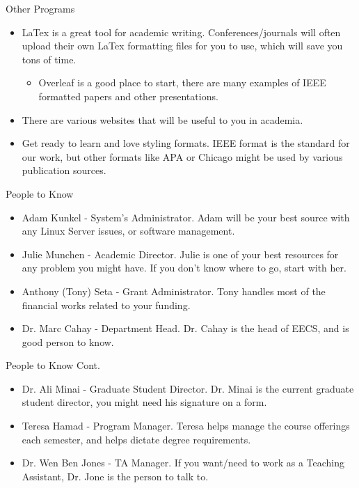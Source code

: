 \documentclass[handout]{beamer}
\begin{document}
\begin{frame}{Other Programs}
\begin{itemize}
  \item LaTex is a great tool for academic writing. Conferences/journals will often upload their own LaTex formatting files for you to use, which will save you tons of time. 
  \begin{itemize}
      \item Overleaf is a good place to start, there are many examples of IEEE formatted papers and other presentations.
  \end{itemize}
  \item There are various websites that will be useful to you in academia. 
  \item Get ready to learn and love styling formats. IEEE format is the standard for our work, but other formats like APA or Chicago might be used by various publication sources.
\end{itemize}
\end{frame}

\begin{frame}{People to Know}
\begin{itemize}
  \item Adam Kunkel - System's Administrator. Adam will be your best source with any Linux Server issues, or software management.
  \item Julie Munchen - Academic Director. Julie is one of your best resources for any problem you might have. If you don't know where to go, start with her.
  \item Anthony (Tony) Seta - Grant Administrator. Tony handles most of the financial works related to your funding. 
  \item Dr. Marc Cahay - Department Head. Dr. Cahay is the head of EECS, and is good person to know.
\end{itemize}
\end{frame}

\begin{frame}{People to Know Cont.}
  \begin{itemize}
    \item Dr. Ali Minai - Graduate Student Director. Dr. Minai is the current graduate student director, you might need his signature on a form.
    \item Teresa Hamad - Program Manager. Teresa helps manage the course offerings each semester, and helps dictate degree requirements.
    \item Dr. Wen Ben Jones - TA Manager. If you want/need to work as a Teaching Assistant, Dr. Jone is the person to talk to.
  \end{itemize}
  \end{frame}
\end{document}
